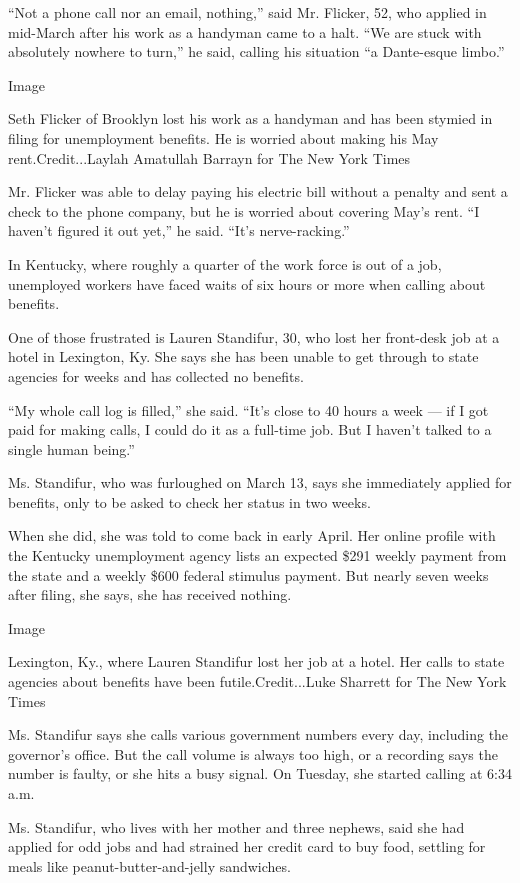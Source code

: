 ``Not a phone call nor an email, nothing,'' said Mr. Flicker, 52, who
applied in mid-March after his work as a handyman came to a halt. ``We
are stuck with absolutely nowhere to turn,'' he said, calling his
situation ``a Dante-esque limbo.''

Image

Seth Flicker of Brooklyn lost his work as a handyman and has been
stymied in filing for unemployment benefits. He is worried about making
his May rent.Credit...Laylah Amatullah Barrayn for The New York Times

Mr. Flicker was able to delay paying his electric bill without a penalty
and sent a check to the phone company, but he is worried about covering
May's rent. ``I haven't figured it out yet,'' he said. ``It's
nerve-racking.''

In Kentucky, where roughly a quarter of the work force is out of a job,
unemployed workers have faced waits of six hours or more when calling
about benefits.

One of those frustrated is Lauren Standifur, 30, who lost her front-desk
job at a hotel in Lexington, Ky. She says she has been unable to get
through to state agencies for weeks and has collected no benefits.

``My whole call log is filled,'' she said. ``It's close to 40 hours a
week --- if I got paid for making calls, I could do it as a full-time
job. But I haven't talked to a single human being.''

Ms. Standifur, who was furloughed on March 13, says she immediately
applied for benefits, only to be asked to check her status in two weeks.

When she did, she was told to come back in early April. Her online
profile with the Kentucky unemployment agency lists an expected \$291
weekly payment from the state and a weekly \$600 federal stimulus
payment. But nearly seven weeks after filing, she says, she has received
nothing.

Image

Lexington, Ky., where Lauren Standifur lost her job at a hotel. Her
calls to state agencies about benefits have been futile.Credit...Luke
Sharrett for The New York Times

Ms. Standifur says she calls various government numbers every day,
including the governor's office. But the call volume is always too high,
or a recording says the number is faulty, or she hits a busy signal. On
Tuesday, she started calling at 6:34 a.m.

Ms. Standifur, who lives with her mother and three nephews, said she had
applied for odd jobs and had strained her credit card to buy food,
settling for meals like peanut-butter-and-jelly sandwiches.


